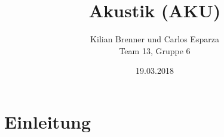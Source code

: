 \documentclass[12pt,a4paper]{article}
\title{Akustik (AKU)}
\author{Kilian Brenner und Carlos Esparza \\ Team 13, Gruppe 6}
\date{19.03.2018}
\begin{document}
\maketitle
\tableofcontents
\newpage

\section{Einleitung}












% 
\end{document}
